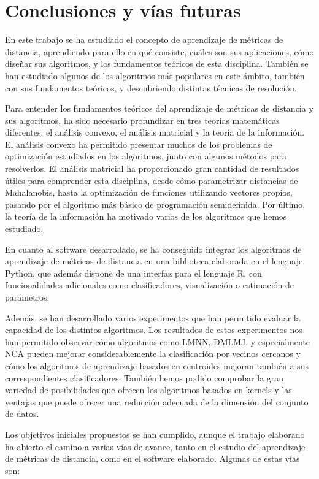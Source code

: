 \chapter{Conclusiones y vías futuras}

En este trabajo se ha estudiado el concepto de aprendizaje de métricas de distancia, aprendiendo para ello en qué consiste, cuáles son sus aplicaciones, cómo diseñar sus algoritmos, y los fundamentos teóricos de esta disciplina. También se han estudiado algunos de los algoritmos más populares en este ámbito, también con sus fundamentos teóricos, y descubriendo distintas técnicas de resolución.

Para entender los fundamentos teóricos del aprendizaje de métricas de distancia y sus algoritmos, ha sido necesario profundizar en tres teorías matemáticas diferentes: el análisis convexo, el análisis matricial y la teoría de la información. El análisis convexo ha permitido presentar muchos de los problemas de optimización estudiados en los algoritmos, junto con algunos métodos para resolverlos. El análisis matricial ha proporcionado gran cantidad de resultados útiles para comprender esta disciplina, desde cómo parametrizar distancias de Mahalanobis, hasta la optimización de funciones utilizando vectores propios, pasando por el algoritmo más básico de programación semidefinida. Por último, la teoría de la información ha motivado varios de los algoritmos que hemos estudiado.

En cuanto al software desarrollado, se ha conseguido integrar los algoritmos de aprendizaje de métricas de distancia en una biblioteca elaborada en el lenguaje Python, que además dispone de una interfaz para el lenguaje R, con funcionalidades adicionales como clasificadores, visualización o estimación de parámetros. 

Además, se han desarrollado varios experimentos que han permitido evaluar la capacidad de los distintos algoritmos. Los resultados de estos experimentos nos han permitido observar cómo algoritmos como LMNN, DMLMJ, y especialmente NCA pueden mejorar considerablemente la clasificación por vecinos cercanos y cómo los algoritmos de aprendizaje basados en centroides mejoran también a sus correspondientes clasificadores. También hemos podido comprobar la gran variedad de posibilidades que ofrecen los algoritmos basados en kernels y las ventajas que puede ofrecer una reducción adecuada de la dimensión del conjunto de datos.

Los objetivos iniciales propuestos se han cumplido, aunque el trabajo elaborado ha abierto el camino a varias vías de avance, tanto en el estudio del aprendizaje de métricas de distancia, como en el software elaborado. Algunas de estas vías son:

